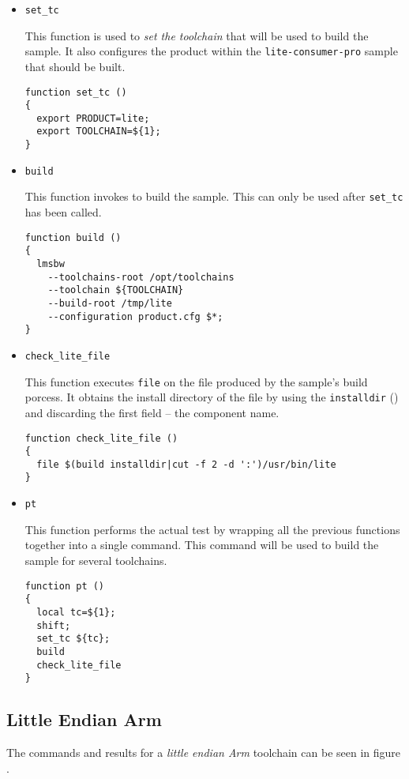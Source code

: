 \begin{itemize}
  \item{\texttt{set\_tc}}

    This function is used to \emph{set the toolchain} that will be
    used to build the sample.  It also configures the product within
    the \texttt{lite-consumer-pro} sample that should be built.

\begin{verbatim}
function set_tc ()
{
  export PRODUCT=lite;
  export TOOLCHAIN=${1};
}
\end{verbatim}

\item{\texttt{build}}

  This function invokes \lmsbw to build the sample.  This can only be
  used after \texttt{set\_tc} has been called.

\begin{verbatim}
function build ()
{
  lmsbw
    --toolchains-root /opt/toolchains
    --toolchain ${TOOLCHAIN}
    --build-root /tmp/lite
    --configuration product.cfg $*;
}
\end{verbatim}

\item{\texttt{check\_lite\_file}}

  This function executes \texttt{file} on the file produced by the
  sample's build porcess.  It obtains the install directory of the
  file by using the \texttt{installdir} ()
  and discarding the first field -- the component name.

\begin{small}
\begin{verbatim}
function check_lite_file ()
{
  file $(build installdir|cut -f 2 -d ':')/usr/bin/lite
}
\end{verbatim}
\end{small}

\item{\texttt{pt}}

  This function performs the actual test by wrapping all the previous
  functions together into a single command.  This command will be used
  to build the sample for several toolchains.

\begin{verbatim}
function pt ()
{
  local tc=${1};
  shift;
  set_tc ${tc};
  build
  check_lite_file
}
\end{verbatim}
\end{itemize}

\subsection{Little Endian Arm}
The commands and results for a \emph{little endian Arm} toolchain can be
seen in figure .

